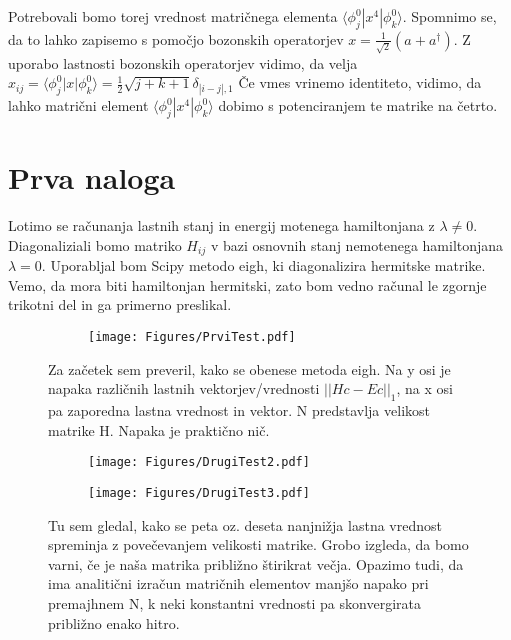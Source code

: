 \documentclass{article}
\begin{document}
Potrebovali bomo torej vrednost matričnega elementa $\langle \phi^0_j | x^4 | \phi^0_k \rangle$.
Spomnimo se, da to lahko zapisemo s pomočjo bozonskih operatorjev $x =\frac{1}{\sqrt{2}} ( a + a^\dagger)$.
Z uporabo lastnosti bozonskih operatorjev vidimo, da velja $x_{ij} = \langle \phi_j^0 | x |\phi_k^0 \rangle = \frac{1}{2} \sqrt{j+k+1} \delta_{|i-j|,1}$ 
Če vmes vrinemo identiteto, vidimo, da lahko matrični element $\langle \phi_j^0 | x^4 | \phi_k^0 \rangle$ dobimo s potenciranjem te matrike na četrto.

\section*{Prva naloga}

Lotimo se računanja lastnih stanj in energij motenega hamiltonjana z $\lambda \neq 0$. Diagonaliziali bomo matriko $H_{ij}$ v bazi osnovnih stanj nemotenega hamiltonjana $\lambda = 0$. Uporabljal bom Scipy metodo eigh, ki diagonalizira hermitske matrike. Vemo, da mora biti hamiltonjan hermitski, zato bom vedno računal le zgornje trikotni del in ga primerno preslikal.

\begin{figure}[H]
\centering
\begin{subfigure}{.7\textwidth}
\texttt{[image: Figures/PrviTest.pdf]}
\end{subfigure}
\caption*{Za začetek sem preveril, kako se obenese metoda eigh. Na y osi je napaka različnih lastnih vektorjev/vrednosti $||Hc - Ec||_1$, na x osi pa zaporedna lastna vrednost in vektor. N predstavlja velikost matrike H. Napaka je praktično nič.}
\end{figure}

\begin{figure}[H]
\centering
\begin{subfigure}{.49\textwidth}
\texttt{[image: Figures/DrugiTest2.pdf]}
\end{subfigure}
\begin{subfigure}{.49\textwidth}
\texttt{[image: Figures/DrugiTest3.pdf]}
\end{subfigure}
\caption*{Tu sem gledal, kako se peta oz. deseta nanjnižja lastna vrednost spreminja z povečevanjem velikosti matrike. Grobo izgleda, da bomo varni, če je naša matrika približno štirikrat večja. Opazimo tudi, da ima analitični izračun matričnih elementov manjšo napako pri premajhnem N, k neki konstantni vrednosti pa skonvergirata približno enako hitro.}
\end{figure}
\end{document}
